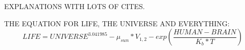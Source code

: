 EXPLANATIONS WITH LOTS OF CITES.\cite{1}

THE EQUATION FOR LIFE, THE UNIVERSE AND EVERYTHING:
\begin{equation}
    LIFE = UNIVERSE^{3.041985} - \mu_{sun} * V_{1,2} - exp(\frac{HUMAN-BRAIN}{K_b*T})
    \label{eq:1.1}
\end{equation}